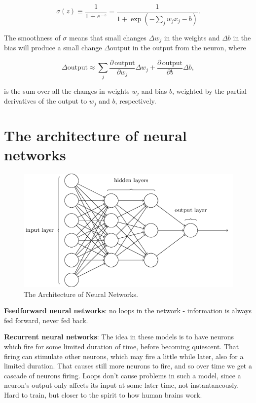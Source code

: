 \documentclass[]{book}
\begin{document}
\begin{equation} 
\sigma(z) \equiv \frac{1}{1 + e^{-z}} = \frac{1}{1 + \exp(-\sum_j w_j x_j - b)}.
\label{eq:nnhd-sn-sigmoid}
\end{equation}

The smoothness of \(\sigma\) means that small changes \(\Delta w_j\) in
the weights and \(\Delta b\) in the bias will produce a small change
\(\Delta \mbox{output}\) in the output from the neuron, where

\begin{equation} 
\Delta \mbox{output} \approx \sum_j \frac{\partial \, \mbox{output}}{\partial w_j} \Delta w_j + 
                             \frac{\partial \, \mbox{output}}{\partial b} \Delta b,
\label{eq:nnhd-sn-smoothness}
\end{equation}

is the sum over all the changes in weights \(w_j\) and bias \(b\),
weighted by the partial derivatives of the output to \(w_j\) and \(b\),
respectively.

\section{The architecture of neural
networks}\label{the-architecture-of-neural-networks}

\begin{figure}

{\centering \includegraphics[width=0.7\linewidth]{fig/01_tikz11} 

}

\caption{The Architecture of Neural Networks.}\label{fig:nnhd-nn-architecture}
\end{figure}

\textbf{Feedforward neural networks}: no loops in the network -
information is always fed forward, never fed back.

\textbf{Recurrent neural networks}: The idea in these models is to have
neurons which fire for some limited duration of time, before becoming
quiescent. That firing can stimulate other neurons, which may fire a
little while later, also for a limited duration. That causes still more
neurons to fire, and so over time we get a cascade of neurons firing.
Loops don't cause problems in such a model, since a neuron's output only
affects its input at some later time, not instantaneously. Hard to
train, but closer to the spirit to how human brains work.
\end{document}

